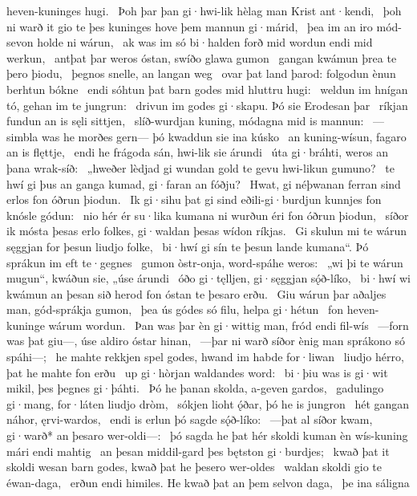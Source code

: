 heven-kuninges hugi. \hld\ Þoh þar þan gi·hwi-lik hèlag man
Krist ant·kendi, \hld\ þoh ni warð it gio te þes kuninges hove
þem mannun gi·márid, \hld\ þea im an iro mód-sevon
holde ni wárun, \hld\ ak was im só bi·halden forð
mid wordun endi mid werkun, \hld\ antþat þar weros óstan,
swíðo glawa gumon \hld\ gangan kwámun
þrea te þero þiodu, \hld\ þegnos snelle,
an langan weg \hld\ ovar þat land þarod:
folgodun ènun berhtun bókne \hld\ endi sóhtun þat barn godes
mid hluttru hugi: \hld\ weldun im hnígan tó,
gehan im te jungrun: \hld\ drivun im godes gi·skapu.
Þó sie Erodesan þar \hld\ ríkjan fundun
an is sęli sittjen, \hld\ slíð-wurdjan kuning,
módagna mid is mannun: \hld\ —simbla was he morðes gern—
þó kwaddun sie ina kúsko \hld\ an kuning-wísun,
fagaro an is flęttje, \hld\ endi he frágoda sán,
hwi-lik sie árundi \hld\ úta gi·bráhti,
weros an þana wrak-síð: \hld\ „hweðer lèdjad gi wundan gold
te gevu hwi-likun gumuno? \hld\ te hwí gi þus an ganga kumad,
gi·faran an fóðju? \hld\ Hwat, gi néþwanan ferran sind
erlos fon óðrun þiodun. \hld\ Ik gi·sihu þat gi sind eðili-gi·burdjun
kunnjes fon knósle gódun: \hld\ nio hér ér su·lika kumana ni wurðun
éri fon óðrun þiodun, \hld\ síðor ik mósta þesas erlo folkes,
gi·waldan þesas wídon ríkjas. \hld\ Gi skulun mi te wárun sęggjan
for þesun liudjo folke, \hld\ bi·hwí gi sín te þesun lande kumana“.
Þó sprákun im eft te·gegnes \hld\ gumon òstr-onja,
word-spáhe weros: \hld\ „wi þi te wárun mugun“, kwáðun sie,
„úse árundi \hld\ óðo gi·tęlljen,
gi·sęggjan sǫ́ð-líko, \hld\ bi·hwí wi kwámun an þesan sið herod
fon óstan te þesaro erðu. \hld\ Giu wárun þar aðaljes man,
gód-sprákja gumon, \hld\ þea ús gódes só filu,
helpa gi·hétun \hld\ fon heven-kuninge
wárum wordun. \hld\ Þan was þar èn gi·wittig man,
fród endi fil-wís \hld\ —forn was þat giu—,
úse aldiro óstar hinan, \hld\ —þar ni warð síðor ènig man
sprákono só spáhi—; \hld\ he mahte rekkjen spel godes,
hwand im habde for·liwan \hld\ liudjo hérro,
þat he mahte fon erðu \hld\ up gi·hòrjan
waldandes word: \hld\ bi·þiu was is gi·wit mikil,
þes þegnes gi·þáhti. \hld\ Þó he þanan skolda,
a-geven gardos, \hld\ gadulingo gi·mang,
for·láten liudjo dròm, \hld\ sókjen lioht ǫ́ðar,
þó he is jungron \hld\ hét gangan náhor,
ęrvi-wardos, \hld\ endi is erlun þó
sagde sǫ́ð-líko: \hld\ —þat al síðor kwam,
gi·warð* an þesaro wer-oldi—: \hld\ þó sagda he þat hér skoldi kuman èn wís-kuning
mári endi mahtig \hld\ an þesan middil-gard
þes bętston gi·burdjes; \hld\ kwað þat it skoldi wesan barn godes,
kwað þat he þesero wer-oldes \hld\ waldan skoldi
gio te éwan-daga, \hld\ erðun endi himiles.
He kwað þat an þem selvon daga, \hld\ þe ina sáligna
